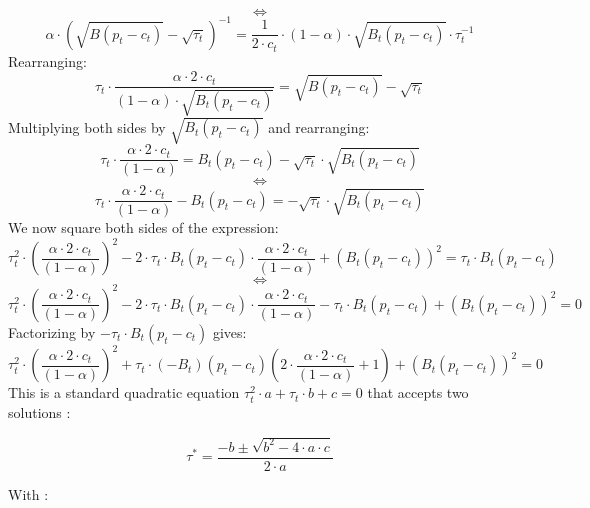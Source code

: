 \documentclass{article}
\begin{document}
$$\iff$$
\begin{equation*}
    \alpha\cdot \left(\sqrt{B(p_{t}-c_{t})}-\sqrt{\tau_{t}}\right)^{-1} = \frac{1}{2\cdot c_{t}}\cdot (1-\alpha)\cdot\sqrt{B_{t}(p_{t}-c_{t})}\cdot\tau_{t}^{-1} 
\end{equation*}
Rearranging:
\begin{equation*}
    \tau_{t}\cdot\frac{\alpha \cdot 2\cdot c_{t}}{(1-\alpha)\cdot\sqrt{B_{t}(p_{t}-c_{t})}}= \sqrt{B(p_{t}-c_{t})}-\sqrt{\tau_{t}} 
\end{equation*}
Multiplying both sides by $\sqrt{B_{t}(p_{t}-c_{t})}$ and rearranging:
\begin{equation*}
    \tau_{t}\cdot\frac{\alpha \cdot 2\cdot c_{t}}{(1-\alpha)}=B_{t}(p_{t}-c_{t})-\sqrt{\tau_{t}}\cdot\sqrt{B_{t}(p_{t}-c_{t})} 
\end{equation*}
$$\iff$$
\begin{equation*}
    \tau_{t}\cdot\frac{\alpha \cdot 2\cdot c_{t}}{(1-\alpha)}-B_{t}(p_{t}-c_{t})=-\sqrt{\tau_{t}}\cdot\sqrt{B_{t}(p_{t}-c_{t})}
\end{equation*}
We now square both sides of the expression:
\begin{equation*}
    \tau_{t}^{2}\cdot\left(\frac{\alpha \cdot 2\cdot c_{t}}{(1-\alpha)}\right)^{2}-2\cdot\tau_{t}\cdot B_{t}\left(p_{t}-c_{t}\right)\cdot \frac{\alpha \cdot 2\cdot c_{t}}{(1-\alpha)}+\left(B_{t}(p_{t}-c_{t})\right)^{2}={\tau_{t}}\cdot{B_{t}(p_{t}-c_{t})}
\end{equation*}
$$\iff$$
\begin{equation*}
    \tau_{t}^{2}\cdot\left(\frac{\alpha \cdot 2\cdot c_{t}}{(1-\alpha)}\right)^{2}-2\cdot\tau_{t}\cdot B_{t}\left(p_{t}-c_{t}\right)\cdot \frac{\alpha \cdot 2\cdot c_{t}}{(1-\alpha)}-{\tau_{t}}\cdot{B_{t}(p_{t}-c_{t})}+\left(B_{t}(p_{t}-c_{t})\right)^{2}=0
\end{equation*}
Factorizing by $-{\tau_{t}}\cdot{B_{t}(p_{t}-c_{t})}$ gives:
\begin{equation*}
    \tau_{t}^{2}\cdot\left(\frac{\alpha \cdot 2\cdot c_{t}}{(1-\alpha)}\right)^{2}+\tau_{t}\cdot \left(-B_{t}\right)\left(p_{t}-c_{t}\right)\left(2\cdot \frac{\alpha \cdot 2\cdot c_{t}}{(1-\alpha)}+1\right)+\left(B_{t}(p_{t}-c_{t})\right)^{2}=0
\end{equation*}
This is a standard quadratic equation $\tau_{t}^{2}\cdot a+\tau_{t}\cdot b + c =0$ that accepts two solutions : 

$$\tau^{*}=\frac{-b\pm\sqrt{b^2-4\cdot a\cdot c}}{2\cdot a}$$

With : 
\end{document}

